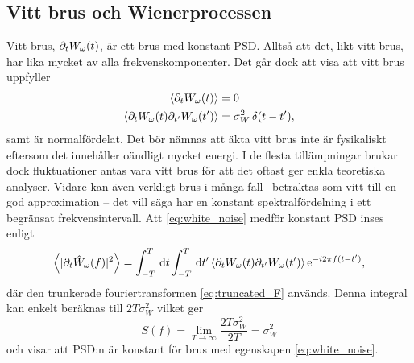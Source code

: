\subsection{Vitt brus och Wienerprocessen}\label{sec:white_noise}
Vitt brus, $\partial_tW_\omega(t)$,\footnotemark{} är ett brus med konstant PSD. Alltså att det, likt vitt brus, har lika mycket av alla frekvenskomponenter. Det går dock att visa att vitt brus uppfyller \cite{Miller_probability2012}
\begin{equation}\label{eq:white_noise}
\begin{aligned}
\ev{\pd_tW_\omega(t)}&=0 \\
\ev{\pd_tW_\omega(t)\pd_{t'}W_\omega(t')}&= \sigma_W^2 \, \delta(t-t'),
\end{aligned}
\end{equation}
samt är normalfördelat. 
Det bör nämnas att äkta vitt brus inte är fysikaliskt eftersom det innehåller oändligt mycket energi. I de flesta tillämpningar brukar dock fluktuationer antas vara vitt brus för att det oftast ger enkla teoretiska analyser. Vidare kan även verkligt brus i många fall~\cite{Engelberg_noise2007} betraktas som vitt till en god approximation -- det vill säga har en konstant spektralfördelning i ett begränsat frekvensintervall. Att \eqref{eq:white_noise} medför konstant PSD inses enligt  
\begin{equation}
    \ev{|\pd_t\hat{W}_\omega(f)|^2} = \int_{-T}^{T}\id{t}\int_{-T}^{T}\id{t'}\ev{\pd_tW_\omega(t)\pd_{t'}W_\omega(t')}\ee^{-i2\pi f(t-t')},
\end{equation}
där den trunkerade fouriertransformen \eqref{eq:truncated_F} används. Denna integral kan enkelt beräknas till $2T\sigma_W^2$ vilket ger 
\begin{equation}
    S(f) = \lim_{T\to\infty}\dfrac{2T\sigma_W^2}{2T} = \sigma_W^2
\end{equation}
och visar att PSD:n är konstant för brus med egenskapen \eqref{eq:white_noise}. 



